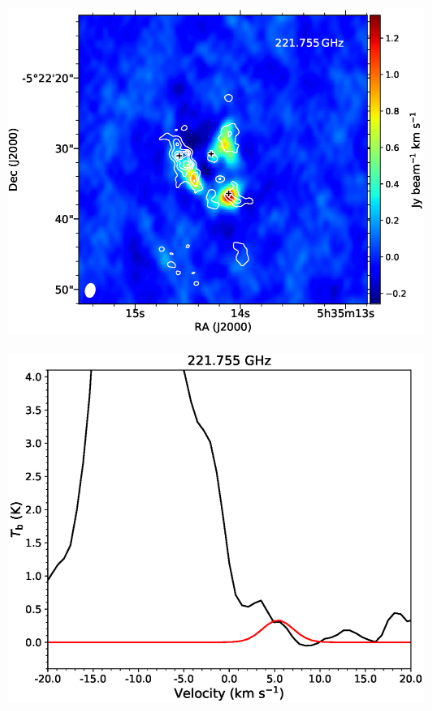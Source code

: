 \begin{figure}[htp] 
\begin{center}
\begin{minipage}{0.98\textwidth} 
\begin{center}
\begin{minipage}{0.48\textwidth}
\begin{center}
\includegraphics[width=0.98\textwidth]{OrionKL/mom0/221.755SV_mom0_3-7.eps}
\label{fig:221mom}
\end{center}
\end{minipage}
\begin{minipage}{0.48\textwidth}
\begin{center}
\includegraphics[width=0.98\textwidth]{OrionKL/spectrum/HC/221.755055w_fit.eps}

\end{center}
\end{minipage}
\end{center}
\end{minipage}
\end{center}
\end{figure}
